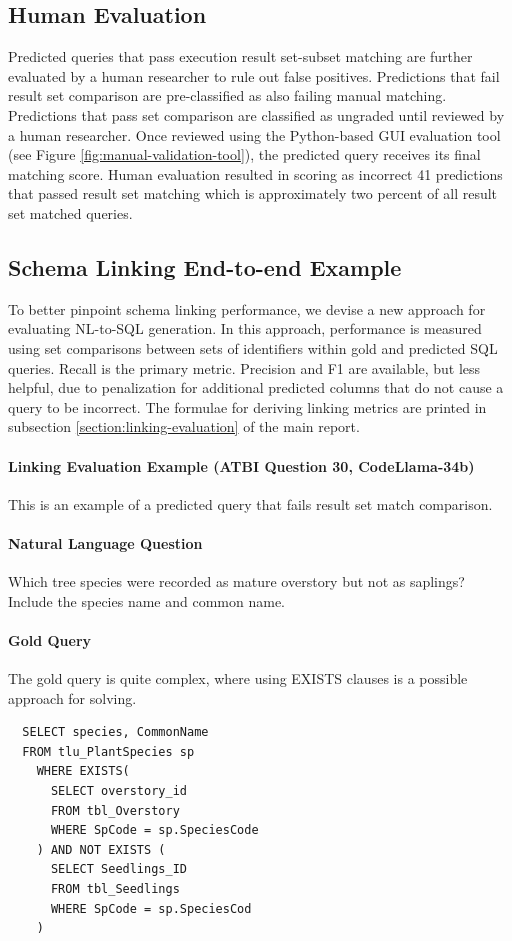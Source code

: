 \subsection{Human Evaluation}
Predicted queries that pass execution result set-subset matching are further evaluated by a human researcher to rule out false positives.
Predictions that fail result set comparison are pre-classified as also failing manual matching.
Predictions that pass set comparison are classified as ungraded until reviewed by a human researcher.
Once reviewed using the Python-based GUI evaluation tool (see Figure \ref{fig:manual-validation-tool}), the predicted query receives its final matching score.
Human evaluation resulted in scoring as incorrect 41 predictions that passed result set matching which is approximately two percent of all result set matched queries.




\subsection{Schema Linking End-to-end Example}

To better pinpoint schema linking performance, we devise a new approach for evaluating NL-to-SQL generation.
In this approach, performance is measured using set comparisons between sets of identifiers within gold and predicted SQL queries.
Recall is the primary metric.
Precision and F1 are available, but less helpful, due to penalization for additional predicted columns that do not cause a query to be incorrect.
The formulae for deriving linking metrics are printed in subsection \ref{section:linking-evaluation} of the main report.

\paragraph{\textbf{Linking Evaluation Example (ATBI Question 30, CodeLlama-34b)}}
This is an example of a predicted query that fails result set match comparison.

\paragraph{Natural Language Question}
Which tree species were recorded as mature overstory but not as saplings? Include the species name and common name.

\paragraph{Gold Query}
The gold query is quite complex, where using EXISTS clauses is a possible approach for solving.
\begin{verbatim}
  SELECT species, CommonName 
  FROM tlu_PlantSpecies sp 
    WHERE EXISTS(
      SELECT overstory_id  	
      FROM tbl_Overstory  	
      WHERE SpCode = sp.SpeciesCode
    ) AND NOT EXISTS (
      SELECT Seedlings_ID  	
      FROM tbl_Seedlings  	
      WHERE SpCode = sp.SpeciesCod
    )
\end{verbatim}

